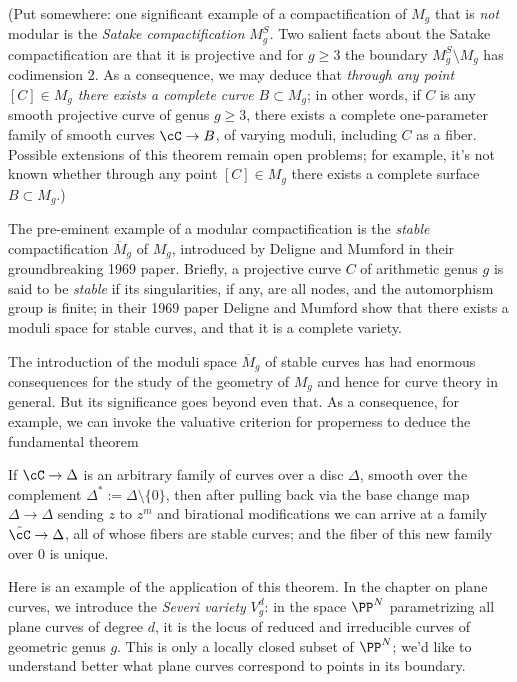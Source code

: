 (Put somewhere: one significant example of a compactification of $M_g$ that is \emph{not} modular is the \emph{Satake compactification} $M_g^S$. Two salient facts about the Satake compactification are that it is projective and for $g \geq 3$ the boundary $M_g^S \setminus M_g$ has codimension 2. As a consequence, we may deduce that \emph{through any point $[C] \in M_g$ there exists a complete curve $B \subset M_g$}; in other words,
 if $C$ is any smooth projective curve of genus $g \geq 3$, there exists a complete one-parameter family of smooth curves $\cC \to B$, of varying moduli, including $C$ as a fiber. Possible extensions of this theorem remain open problems; for example, it's not known whether  through any point $[C] \in M_g$ there exists a complete surface $B \subset M_g$.)
 
 The pre-eminent example of a modular compactification is the \emph{stable} compactification $\overline M_g$ of $M_g$, introduced by Deligne and Mumford in their groundbreaking 1969 paper. Briefly, a projective curve $C$ of arithmetic genus $g$ is said to be \emph{stable} if its singularities, if any, are all nodes, and the automorphism group is finite; in their 1969 paper Deligne and Mumford show that there exists a moduli space for stable curves, and that it is a complete variety.

The introduction of the moduli space $\overline M_g$ of stable curves has had enormous consequences for the study of the geometry of $M_g$ and hence for curve theory in general. But its significance goes beyond even that. As a consequence, for example, we can invoke the valuative criterion for properness to deduce the fundamental theorem

\begin{theorem}
If $\cC \to \Delta$ is an arbitrary family of curves over a disc $\Delta$, smooth over the complement $\Delta^* := \Delta \setminus \{0\}$, then after pulling back via the base change map $\Delta \to \Delta$ sending $z$ to $z^m$ and birational modifications we can arrive at a family $\tilde \cC \to \Delta$, all of whose fibers are stable curves; and the fiber of this new family over $0$ is unique.
\end{theorem}

Here is an example of the application of this theorem. In the chapter on plane curves, we introduce the \emph{Severi variety} $V^d_g$: in the space $\PP^N$ parametrizing all plane curves of degree $d$, it is the locus of reduced and irreducible curves of geometric genus $g$. This is only a locally closed subset of $\PP^N$; we'd like to understand better what plane curves correspond to points in its boundary.

